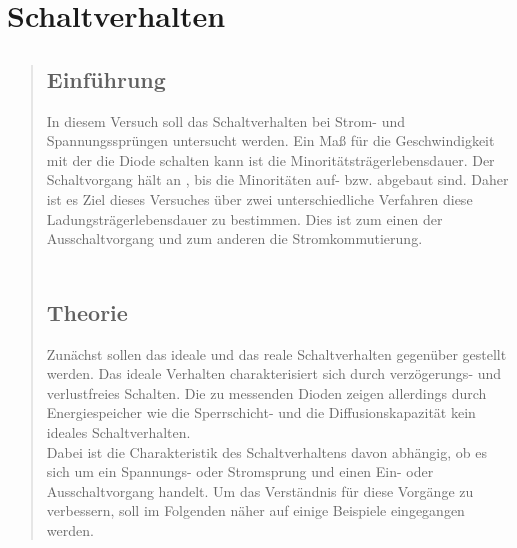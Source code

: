 \section{Schaltverhalten}
\begin{quote}

    \subsection{Einführung}

    In diesem Versuch soll das Schaltverhalten bei Strom- und Spannungssprüngen
    untersucht werden. Ein Maß für die Geschwindigkeit mit der die Diode schalten
    kann ist die Minoritätsträgerlebensdauer. Der Schaltvorgang hält an
    , bis die Minoritäten auf- bzw. abgebaut sind. Daher ist es Ziel dieses
    Versuches über zwei unterschiedliche Verfahren diese Ladungsträgerlebensdauer
    zu bestimmen. Dies ist zum einen der Ausschaltvorgang und zum anderen
    die Stromkommutierung.\\
    \\

    \subsection{Theorie}

    Zunächst sollen das ideale und das reale Schaltverhalten gegenüber gestellt
    werden. Das ideale Verhalten charakterisiert sich durch verzögerungs- und
    verlustfreies Schalten. Die zu messenden Dioden zeigen allerdings durch
    Energiespeicher wie die Sperrschicht- und die Diffusionskapazität kein
    ideales Schaltverhalten. \\

    Dabei ist die Charakteristik des Schaltverhaltens davon abhängig, ob es
    sich um ein Spannungs- oder Stromsprung und einen Ein- oder Ausschaltvorgang
    handelt. Um das Verständnis für diese Vorgänge zu verbessern, soll im
    Folgenden näher auf einige Beispiele eingegangen werden.\\


\end{quote}
